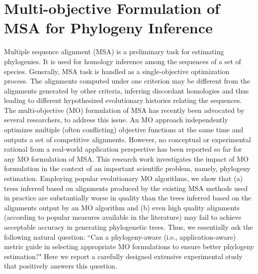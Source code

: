 

\graphicspath{{cybernatics/}}

\chapter{Multi-objective Formulation of MSA for Phylogeny Inference} \label{ch:cybernatics}
 Multiple sequence alignment (MSA) is a preliminary task for estimating phylogenies. It is used for homology inference among the sequences of a set of species. Generally, MSA task is handled as a single-objective optimization process.
The alignments computed under one criterion may be different from the alignments generated by other criteria, inferring discordant homologies and thus leading to different hypothesized evolutionary histories relating the sequences. The multi-objective (MO) formulation of MSA has recently been advocated by several researchers, to address this issue. An MO approach independently optimizes multiple (often conflicting) objective functions at the same time and outputs a set of competitive alignments. However, no conceptual or experimental rational from a real-world application perspective has been reported so far for any MO formulation of MSA. This research work investigates the impact of MO formulation in the context of an important scientific problem, namely, phylogeny estimation. Employing popular evolutionary MO algorithms, we show that (a) trees inferred based on alignments produced by the existing MSA methods used in practice are substantially worse in quality than the trees inferred based on the alignments output by an MO algorithm and
(b) even high quality alignments (according to popular measures available in the literature) may fail to achieve acceptable accuracy in generating phylogenetic trees.      
Thus, we essentially ask the following natural question: ``Can a phylogeny-aware (i.e., application-aware) metric guide in selecting appropriate MO formulations to ensure better phylogeny estimation?" Here we report a carefully designed extensive experimental study that positively answers this question. 



